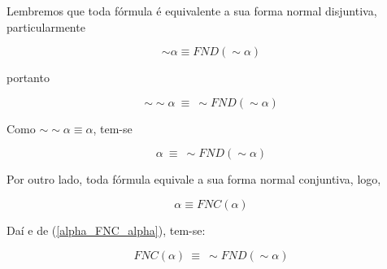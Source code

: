 Lembremos que toda fórmula é equivalente a sua forma normal disjuntiva, particularmente

$$\sim \alpha \equiv FND(\sim \alpha)$$

portanto

$$\sim \sim \alpha\ \equiv\ \sim FND(\sim \alpha)$$

Como $\sim \sim \alpha \equiv \alpha$, tem-se

\begin{equation}\label{alpha_FNC_alpha}
    \alpha\ \equiv\ \sim FND(\sim \alpha) \tag{1}
\end{equation}

Por outro lado, toda fórmula equivale a sua forma normal conjuntiva, logo,

\begin{equation*}
    \alpha \equiv FNC(\alpha)
\end{equation*}

Daí e de (\ref{alpha_FNC_alpha}), tem-se:

\begin{equation*}
    FNC(\alpha)\ \equiv\ \sim FND(\sim \alpha)
\end{equation*}
